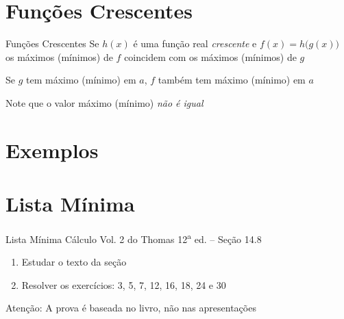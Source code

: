 \documentclass[fleqn,utf8,aspectratio=169,12pt]{beamer}
\begin{document}
\section{Funções Crescentes}

\begin{frame}{Funções Crescentes}
  Se $h(x)$ é uma função real \emph{crescente}
  \pause
  e \(f(x) = h\big(g(x)\big)\) \\
  \pause
  os máximos (mínimos) de $f$ coincidem com os máximos (mínimos) de $g$

  \pause
  \bigskip
  \bigskip
  Se $g$ tem máximo (mínimo) em $a$, $f$ também tem máximo (mínimo) em $a$
  \bigskip
  \bigskip

  \pause
  Note que o valor máximo (mínimo) \emph{não é igual}
\end{frame}

\section{Exemplos}





\section{Lista Mínima}

\begin{frame}{Lista Mínima}
  Cálculo Vol. 2 do Thomas 12\textsuperscript{a} ed. -- Seção 14.8
  \begin{enumerate}
    \item Estudar o texto da seção
    \item Resolver os exercícios: 3, 5, 7, 12, 16, 18, 24 e 30
  \end{enumerate}

  \vfill
  Atenção: A prova é baseada no livro, não nas apresentações
\end{frame}

\end{document}
